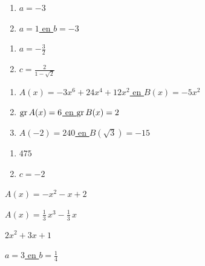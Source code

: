 \documentclass{ximera}
\begin{document}
\begin{Antwoord} \label{antw1.9}
\begin{enumerate}
\item
\hyperlink{oef1.9}{$a=-3$}
\item
\hyperlink{oef1.9}{$a = 1$ en $b = -3$}
\end{enumerate}
\end{Antwoord}

\begin{Antwoord} \label{antw1.10}
\begin{enumerate}
\item
\hyperlink{oef1.10}{$a = -\frac{3}{2}$}
\item
\hyperlink{oef1.10}{$c = \frac{2}{1-\sqrt{2}}$}
\end{enumerate}
\end{Antwoord}

\begin{Antwoord} \label{antw1.11}
\begin{enumerate}
\item
\hyperlink{oef1.11}{$A(x) = -3x^6+24x^4+12x^2$ en $B(x) = -5x^2$}
\item
\hyperlink{oef1.11}{$\operatorname{gr} A(x) = 6$ en $\operatorname{gr} B(x) = 2$}
\item
\hyperlink{oef1.11}{$A(-2) = 240$ en $B(\sqrt{3}) = -15$}
\end{enumerate}
\end{Antwoord}


\begin{Antwoord} \label{antw1.12}
\begin{enumerate}
\item
\hyperlink{oef1.12}{$475$}
\item
\hyperlink{oef1.12}{$c = -2$}
\end{enumerate}
\end{Antwoord}

\begin{Antwoord} \label{antw1.13}
\hyperlink{oef1.13}{$A(x) = -x^2-x+2$}
\end{Antwoord}

\begin{Antwoord} \label{antw1.14}
\hyperlink{oef1.14}{$A(x) = \frac{1}{3}\,x^3-\frac{1}{3}\,x$}
\end{Antwoord}

\begin{Antwoord} \label{antw1.15}
\hyperlink{oef1.15}{$2x^2+3x+1$}
\end{Antwoord}

\begin{Antwoord} \label{antw1.16}
\hyperlink{oef1.16}{$a = 3$ en $b = \frac{1}{4}$}
\end{Antwoord}
\end{document}
